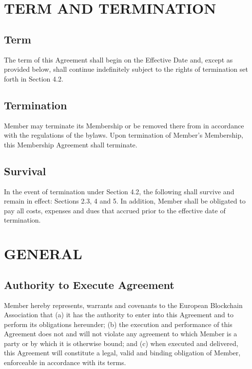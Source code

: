 \documentclass{article}
\begin{document}
\section{TERM AND TERMINATION}

\subsection{Term}

The term of this Agreement shall begin on the Effective Date and, except as provided below, shall continue indefinitely subject to the rights of termination set forth in Section 4.2.

\subsection{Termination}

Member may terminate its Membership or be removed there from in accordance with the regulations of the bylaws. Upon termination of Member’s Membership, this Membership Agreement shall terminate.

\subsection{Survival}

In the event of termination under Section 4.2, the following shall survive and remain in effect: Sections 2.3, 4 and 5. In addition, Member shall be obligated to pay all costs, expenses and dues that accrued prior to the effective date of termination.

\section{GENERAL}

\subsection{Authority to Execute Agreement}

Member hereby represents, warrants and covenants to the European Blockchain Association that (a) it has the authority to enter into this Agreement and to perform its obligations hereunder; (b) the execution and performance of this Agreement does not and will not violate any agreement to which Member is a party or by which it is otherwise bound; and (c) when executed and delivered, this Agreement will constitute a legal, valid and binding obligation of Member, enforceable in accordance with its terms.
\end{document}
